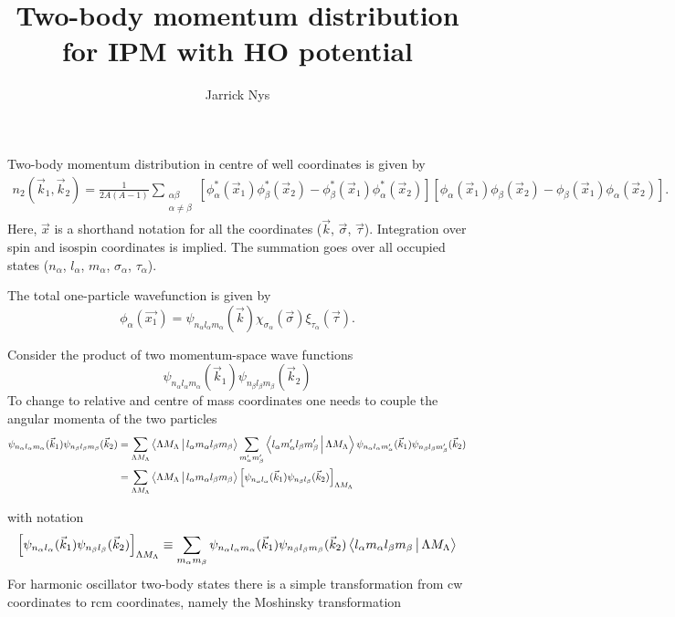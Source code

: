 \documentclass[12pt]{article}
\title{Two-body momentum distribution for IPM with HO potential}
\author{Jarrick Nys}
\begin{document}
\maketitle
Two-body momentum distribution in centre of well coordinates is given by
\begin{align} \label{two-body}
n_2(\vec{k}_1,\vec{k}_2) = \frac{1}{2A(A-1)}\sum_{\substack{\alpha \beta \\ \alpha  \neq \beta}} \left[\phi^*_{\alpha}(\vec{x}_1)\phi^*_{\beta}(\vec{x}_2)- \phi^*_{\beta}(\vec{x}_1)\phi^*_{\alpha}(\vec{x}_2) \right] \left[ \phi_{\alpha}(\vec{x}_1)\phi_{\beta}(\vec{x}_2)  - \phi_{\beta}(\vec{x}_1)\phi_{\alpha}(\vec{x}_2) \right].
\end{align}
Here, $\vec{x}$ is a shorthand notation for all the coordinates ($\vec{k}$, $\vec{\sigma}$, $\vec{\tau}$). Integration over spin and isospin coordinates is implied.
The summation goes over all occupied states  ($n_\alpha$, $l_\alpha$, $m_\alpha$, $\sigma_\alpha$, $\tau_\alpha$).

The total one-particle wavefunction is given by
\begin{equation}
\phi_\alpha (\vec{x_1}) = \psi_{n_\alpha l_\alpha m_\alpha}(\vec{k}) \chi_{\sigma_\alpha}(\vec{\sigma}) \xi_{\tau_\alpha}(\vec{\tau}).
\end{equation}

Consider the product of two momentum-space wave functions
\begin{equation}
\psi_{n_\alpha l_\alpha  m_\alpha }(\vec{k}_1)\psi_{n_\beta l_\beta m_\beta}(\vec{k}_2) 
\end{equation}
To change to relative and centre of mass coordinates one needs to couple the angular momenta of the two particles
\begin{align*}
\psi_{n_\alpha l_\alpha  m_\alpha }(\vec{k}_1)\psi_{n_\beta l_\beta m_\beta}(\vec{k}_2)  & = \sum_{\Lambda M_\Lambda} \Braket{\Lambda M_\Lambda | l_\alpha  m_\alpha  l_\beta m_\beta} \sum_{m^{\prime}_\alpha  m^{\prime}_\beta } \Braket{ l_\alpha  m^{\prime}_\alpha  l_\beta m^{\prime}_\beta | \Lambda M_\Lambda} \psi_{n_\alpha l_\alpha  m^{\prime}_\alpha }(\vec{k}_1)\psi_{n_\beta l_\beta m^{\prime}_\beta }(\vec{k}_2) \\
& = \sum_{\Lambda M_\Lambda} \Braket{\Lambda M_\Lambda | l_\alpha  m_\alpha  l_\beta m_\beta} \left[ \psi_{n_\alpha l_\alpha }(\vec{k}_1)\psi_{n_\beta l_\beta}(\vec{k}_2) \right]_{\Lambda M_\Lambda} 
\end{align*}

with notation 
\begin{equation*}
\left[ \psi_{n_\alpha l_\alpha}(\vec{k}_1) \psi_{n_\beta l_\beta}(\vec{k}_2) \right]_{\Lambda M_\Lambda} \equiv \sum_{m_\alpha m_\beta} \psi_{n_\alpha l_\alpha m_\alpha}(\vec{k}_1) \psi_{n_\beta l_\beta m_\beta}(\vec{k}_2) \Braket{l_\alpha m_\alpha l_\beta m_\beta |\Lambda M_\Lambda}
\end{equation*}
For harmonic oscillator two-body states there is a simple transformation from cw coordinates to rcm coordinates, namely the Moshinsky transformation
\end{document}
